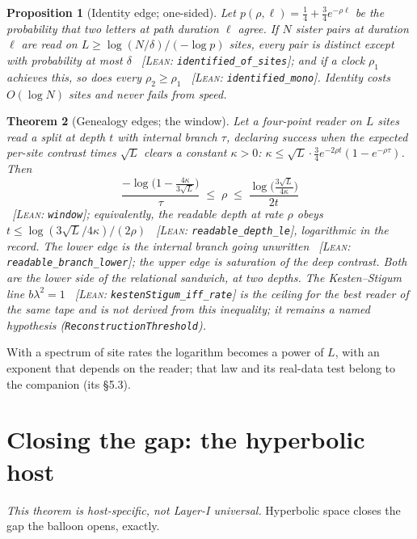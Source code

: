 \documentclass[11pt,reqno]{amsart}
\theoremstyle{plain}
\newtheorem{theorem}{Theorem}[section]
\newtheorem{proposition}[theorem]{Proposition}
\theoremstyle{definition}
\newcommand{\cert}[1]{{\footnotesize\ [\textsc{Lean}: \texttt{#1}]}}
\begin{document}
\begin{proposition}[Identity edge; one-sided]\label{prop:identity}
Let $p(\rho,\ell)=\tfrac14+\tfrac34e^{-\rho\ell}$ be the probability that two letters at path duration $\ell$ agree. If $N$ sister pairs at duration $\ell$ are read on $L\ge\log(N/\delta)/(-\log p)$ sites, every pair is distinct except with probability at most $\delta$ \cert{identified\_\allowbreak{}of\_\allowbreak{}sites}; and if a clock $\rho_1$ achieves this, so does every $\rho_2\ge\rho_1$ \cert{identified\_\allowbreak{}mono}. Identity costs $O(\log N)$ sites and never fails from speed.
\end{proposition}

\begin{theorem}[Genealogy edges; the window]\label{thm:window}
Let a four-point reader on $L$ sites read a split at depth $t$ with internal branch $\tau$, declaring success when the expected per-site contrast times $\sqrt L$ clears a constant $\kappa>0$: $\kappa\le\sqrt L\cdot\tfrac34e^{-2\rho t}(1-e^{-\rho\tau})$. Then
\[
\frac{-\log\bigl(1-\tfrac{4\kappa}{3\sqrt L}\bigr)}{\tau}\;\le\;\rho\;\le\;\frac{\log\bigl(\tfrac{3\sqrt L}{4\kappa}\bigr)}{2t}
\]
\cert{window}; equivalently, the readable depth at rate $\rho$ obeys $t\le\log(3\sqrt L/4\kappa)/(2\rho)$ \cert{readable\_\allowbreak{}depth\_\allowbreak{}le}, logarithmic in the record. The lower edge is the internal branch going unwritten \cert{readable\_\allowbreak{}branch\_\allowbreak{}lower}; the upper edge is saturation of the deep contrast. Both are the lower side of the relational sandwich, at two depths. The Kesten--Stigum line $b\lambda^2=1$ \cert{kestenStigum\_\allowbreak{}iff\_\allowbreak{}rate} is the ceiling for the \emph{best} reader of the same tape and is not derived from this inequality; it remains a named hypothesis (\texttt{ReconstructionThreshold}).
\end{theorem}

With a spectrum of site rates the logarithm becomes a power of $L$, with an exponent that depends on the reader; that law and its real-data test belong to the companion (its \S5.3).

\section{Closing the gap: the hyperbolic host}\label{sec:relational}

\emph{This theorem is host-specific, not Layer-I universal.} Hyperbolic space closes the gap the balloon opens, exactly.
\end{document}

